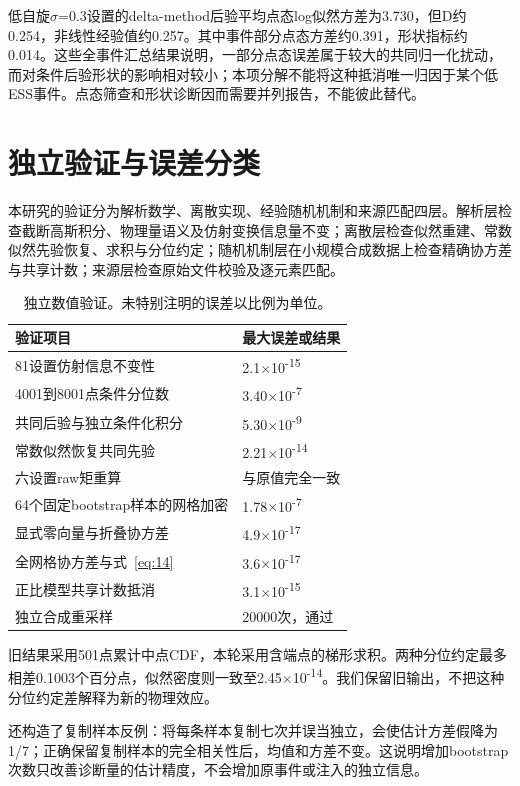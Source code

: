 \documentclass[UTF8,a4paper,11pt,fontset=fandol]{ctexart}
\begin{document}
低自旋\(\sigma\)=0.3设置的delta-method后验平均点态log似然方差为3.730，但D约0.254，非线性经验值约0.257。其中事件部分点态方差约0.391，形状指标约0.014。这些全事件汇总结果说明，一部分点态误差属于较大的共同归一化扰动，而对条件后验形状的影响相对较小；本项分解不能将这种抵消唯一归因于某个低ESS事件。点态筛查和形状诊断因而需要并列报告，不能彼此替代。

\FloatBarrier
\section{独立验证与误差分类}\label{sec:8}
本研究的验证分为解析数学、离散实现、经验随机机制和来源匹配四层。解析层检查截断高斯积分、物理量语义及仿射变换信息量不变；离散层检查似然重建、常数似然先验恢复、求积与分位约定；随机机制层在小规模合成数据上检查精确协方差与共享计数；来源层检查原始文件校验及逐元素匹配。

\begin{table}[tbp]
\centering\small
\caption{独立数值验证。未特别注明的误差以比例为单位。}\label{tab:5}
\begin{tabularx}{\linewidth}{YY}
\toprule
验证项目 & 最大误差或结果 \\
\midrule
81设置仿射信息不变性 & 2.1\(\times\)10\textsuperscript{-15} \\
4001到8001点条件分位数 & 3.40\(\times\)10\textsuperscript{-7} \\
共同后验与独立条件化积分 & 5.30\(\times\)10\textsuperscript{-9} \\
常数似然恢复共同先验 & 2.21\(\times\)10\textsuperscript{-14} \\
六设置raw矩重算 & 与原值完全一致 \\
64个固定bootstrap样本的网格加密 & 1.78\(\times\)10\textsuperscript{-7} \\
显式零向量与折叠协方差 & 4.9\(\times\)10\textsuperscript{-17} \\
全网格协方差与式~\eqref{eq:14} & 3.6\(\times\)10\textsuperscript{-17} \\
正比模型共享计数抵消 & 3.1\(\times\)10\textsuperscript{-15} \\
独立合成重采样 & 20000次，通过 \\
\bottomrule
\end{tabularx}
\end{table}
旧结果采用501点累计中点CDF，本轮采用含端点的梯形求积。两种分位约定最多相差0.1003个百分点，似然密度则一致至2.45\(\times\)10\textsuperscript{-14}。我们保留旧输出，不把这种分位约定差解释为新的物理效应。

还构造了复制样本反例：将每条样本复制七次并误当独立，会使估计方差假降为1/7；正确保留复制样本的完全相关性后，均值和方差不变。这说明增加bootstrap次数只改善诊断量的估计精度，不会增加原事件或注入的独立信息。
\end{document}
